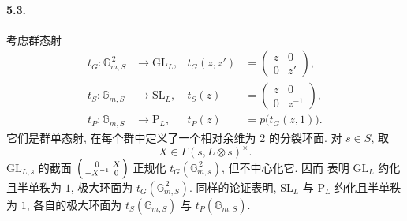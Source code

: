 \paragraph{\textbf{5.3.}}
考虑群态射
\[
\begin{aligned}
 t_G\colon\mathbb G_{m,S}^{\,2}&\longrightarrow\mathrm{GL}_L,
 &t_G(z,z')&=\begin{pmatrix}z&0\\0&z'\end{pmatrix},\\
 t_S\colon\mathbb G_{m,S}&\longrightarrow\mathrm{SL}_L,
 &t_S(z)&=\begin{pmatrix}z&0\\0&z^{-1}\end{pmatrix},\\
 t_P\colon\mathbb G_{m,S}&\longrightarrow\mathrm P_L,
 &t_P(z)&=p\bigl(t_G(z,1)\bigr).
\end{aligned}
\]
它们是群单态射, 在每个群中定义了一个相对余维为 \(2\) 的分裂环面. 对 \(s\in S\), 取
\[
 X\in\Gamma(s,L\otimes s)^\times.
\]
\(\mathrm{GL}_{L,s}\) 的截面 \(\begin{psmallmatrix}0&X\\-X^{-1}&0\end{psmallmatrix}\) 正规化 \(t_G(\mathbb G_{m,s}^{\,2})\), 但不中心化它. 因而 表明 \(\mathrm{GL}_L\) 约化且半单秩为 \(1\), 极大环面为 \(t_G(\mathbb G_{m,S}^{\,2})\). 同样的论证表明, \(\mathrm{SL}_L\) 与 \(\mathrm P_L\) 约化且半单秩为 \(1\), 各自的极大环面为 \(t_S(\mathbb G_{m,S})\) 与 \(t_P(\mathbb G_{m,S})\).

